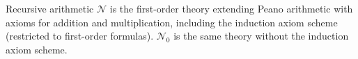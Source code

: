 Recursive arithmetic $\mathcal{N}$ is the first-order theory extending Peano arithmetic with axioms for addition and multiplication, including the induction axiom scheme (restricted to first-order formulas). $\mathcal{N}_0$ is the same theory without the induction axiom scheme.
